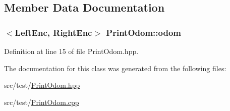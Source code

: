 \subsection{Member Data Documentation}
\hypertarget{classPrintOdom_a4741396ec009336b54896ade384b102d}{
\subsubsection[{odom}]{$<${\bf Left\-Enc}, {\bf Right\-Enc}$>$ Print\-Odom\-::odom\hspace{0.3cm}{\ttfamily [private]}}}\label{classPrintOdom_a4741396ec009336b54896ade384b102d}


Definition at line 15 of file Print\-Odom.\-hpp.



The documentation for this class was generated from the following files\-:\begin{DoxyCompactItemize}
\item 
src/test/\hyperlink{PrintOdom_8hpp}{Print\-Odom.\-hpp}\item 
src/test/\hyperlink{PrintOdom_8cpp}{Print\-Odom.\-cpp}\end{DoxyCompactItemize}

